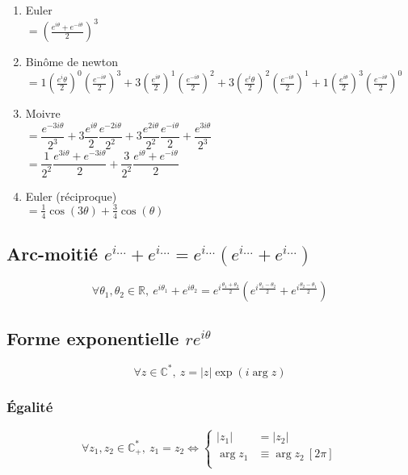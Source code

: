 \documentclass{article}
\newcommand{\R}{{\mathbb R}}
\renewcommand{\C}{{\mathbb C}}
\renewcommand{\cong}{\equiv}
\begin{document}
\begin{enumerate}
	\item Euler \\
		$= \left( \frac{e^{i\theta}+e^{-i\theta}}{2} \right)^3$
	\item Binôme de newton \\
		$= 1\left( \frac{e^i{\theta}}{2} \right)^0\left( \frac{e^{-i\theta}}{2} \right)^3 + 3\left( \frac{e^{i\theta}}{2} \right)^1 \left( \frac{e^{-i\theta}}{2} \right)^2 + 3\left( \frac{e^i{\theta}}{2} \right)^2\left( \frac{e^{-i\theta}}{2} \right)^1 + 1\left( \frac{e^{i\theta}}{2} \right)^3 \left( \frac{e^{-i\theta}}{2} \right)^0$
	\item Moivre \\
		$= \dfrac{e^{-3i\theta}}{2^3} + 3\dfrac{e^{i\theta}}{2}\dfrac{e^{-2i\theta}}{2^2}+ 3\dfrac{e^{2i\theta}}{2^2}\dfrac{e^{-i\theta}}{2} + \dfrac{e^{3i\theta}}{2^3}$ \\
		$= \dfrac{1}{2^2}\dfrac{e^{3i\theta} + e^{-3i\theta}}{2} + \dfrac{3}{2^2}\dfrac{e^{i\theta} + e^{-i\theta}}{2}$
	\item Euler (réciproque) \\
		$= \frac{1}{4}\cos(3\theta) + \frac{3}{4}\cos(\theta)$
\end{enumerate}

\subsection{Arc-moitié $e^{i\ldots} + e^{i\ldots} = e^{i\ldots}(e^{i\ldots} + e^{i\ldots})$}

\[
	\forall \theta_1, \theta_2 \in \R,\ e^{i\theta_1}+e^{i\theta_2} = e^{i\frac{\theta_1+\theta_2}{2}}(e^{i\frac{\theta_1-\theta_2}{2}}+e^{i\frac{\theta_2-\theta_1}{2}})
\] 

\subsection{Forme exponentielle $re^{i\theta}$}
\[
	\forall z\in \C^{\ast},\ z = |z|\exp(i\arg z)
\] 
\subsubsection{Égalité}
\[
	\forall z_1, z_2 \in \C_+^{\ast},\ z_1 = z_2 \iff \begin{cases}
		|z_1| &= |z_2| \\
		\arg z_1 &\cong \arg z_2\ [2\pi] \\
	\end{cases}
\] 
\end{document}
